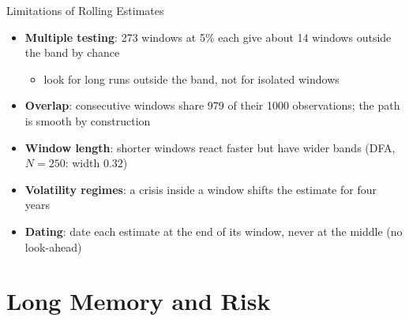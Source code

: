 \begin{frame}{Limitations of Rolling Estimates}
\itemsize{\small}
\begin{itemize}
    \item \textbf{Multiple testing}: 273 windows at 5\% each give about 14 windows outside the band by chance
    \begin{itemize}
        \item look for long runs outside the band, not for isolated windows
    \end{itemize}
    \item \textbf{Overlap}: consecutive windows share 979 of their 1000 observations; the path is smooth by construction
    \item \textbf{Window length}: shorter windows react faster but have wider bands (DFA, $N = 250$: width $0.32$)
    \item \textbf{Volatility regimes}: a crisis inside a window shifts the estimate for four years
    \item \textbf{Dating}: date each estimate at the end of its window, never at the middle (no look-ahead)
\end{itemize}
\end{frame}


\section{Long Memory and Risk}


